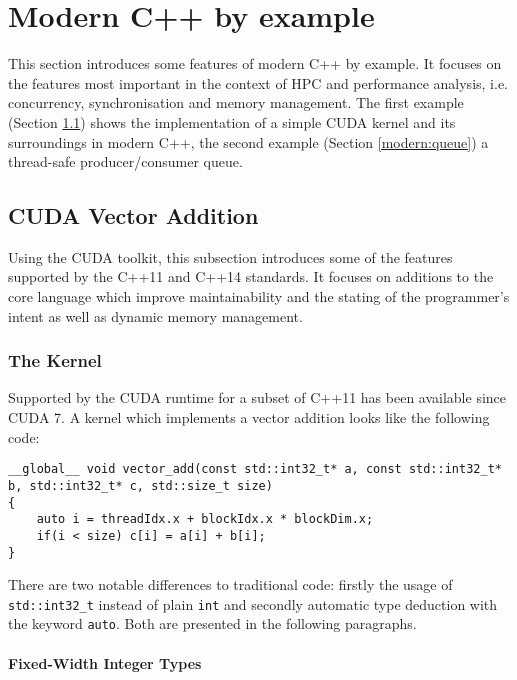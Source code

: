 \section{Modern C++ by example}\label{modern}

This section introduces some features of modern C++ by example. It focuses on the features most important in the context of HPC and performance analysis, i.e. concurrency, synchronisation and memory management. The first example (Section \ref{modern:vec_add}) shows the implementation of a simple CUDA kernel and its surroundings in modern C++, the second example (Section \ref{modern:queue}) a thread-safe producer/consumer queue.

\subsection{CUDA Vector Addition}\label{modern:vec_add}

Using the CUDA toolkit, this subsection introduces some of the features supported by the C++11 and C++14 standards. It focuses on additions to the core language which improve maintainability and the stating of the programmer's intent as well as dynamic memory management.

\subsubsection{The Kernel}\label{modern:vec_add:kernel}

Supported by the CUDA runtime for a subset of C++11 has been available since CUDA 7. A kernel which implements a vector addition looks like the following code:

\begin{verbatim}
__global__ void vector_add(const std::int32_t* a, const std::int32_t* b, std::int32_t* c, std::size_t size)
{
    auto i = threadIdx.x + blockIdx.x * blockDim.x;
    if(i < size) c[i] = a[i] + b[i];
}
\end{verbatim}

\noindent There are two notable differences to traditional code: firstly the usage of \texttt{std::int32\_t} instead of plain \texttt{int} and secondly automatic type deduction with the keyword \texttt{auto}. Both are presented in the following paragraphs.

\paragraph{Fixed-Width Integer Types}

